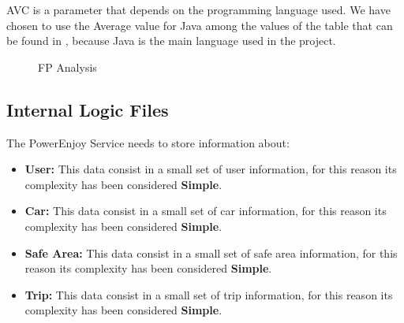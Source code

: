 AVC is a parameter that depends on the programming language used. We have chosen to use the Average value for Java among the values of the table that can be found in \cite{AVCTable}, because Java is the main language used in the project. 

\begin{figure}[h]
	\centering
	\caption{FP Analysis}
\end{figure}
\FloatBarrier


\subsection{Internal Logic Files} 

The PowerEnjoy Service needs to store information about:

\begin{itemize}
	\item \textbf{User:} This data consist in a small set of user information, for this reason its complexity has been considered \textbf{Simple}.
	\item \textbf{Car:} This data consist in a small set of car information, for this reason its complexity has been considered \textbf{Simple}.
	\item \textbf{Safe Area:} This data consist in a small set of safe area information, for this reason its complexity has been considered \textbf{Simple}.
	\item \textbf{Trip:} This data consist in a small set of trip information, for this reason its complexity has been considered \textbf{Simple}.
\end{itemize}

